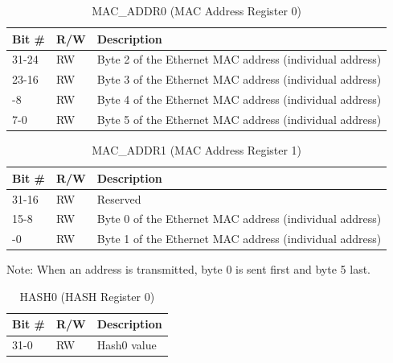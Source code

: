 \begin{xltabular}{\textwidth}{|l|l|X|}
  
  \hline
  {\bf Bit \#} & {\bf R/W} & {\bf Description} \\ \hline \hline
  \endfirsthead
  \hline
  \caption{MAC\_ADDR0 (MAC Address Register 0)}
  \endlastfoot

  31-24   & RW  & Byte 2 of the Ethernet MAC address (individual address) \\* \nobreakhline
  23-16   & RW  & Byte 3 of the Ethernet MAC address (individual address) \\* -8    & RW  & Byte 4 of the Ethernet MAC address (individual address) \\* \nobreakhline
  7-0     & RW  & Byte 5 of the Ethernet MAC address (individual address) \\
                  \hline
\end{xltabular}
\label{csr_details:mac_addr0}

\begin{xltabular}{\textwidth}{|l|l|X|}
  
  \hline
  {\bf Bit \#} & {\bf R/W} & {\bf Description} \\ \hline \hline
  \endfirsthead
  \hline
  \caption{MAC\_ADDR1 (MAC Address Register 1)}
  \endlastfoot

  31-16   & RW  & Reserved \\* \nobreakhline
  15-8    & RW  & Byte 0 of the Ethernet MAC address (individual address) \\* -0     & RW  & Byte 1 of the Ethernet MAC address (individual address) \\
\end{xltabular}
\label{csr_details:mac_addr1}

Note: When an address is transmitted, byte 0 is sent first and byte 5 last.

\begin{xltabular}{\textwidth}{|l|l|X|}
  
  \hline
  {\bf Bit \#} & {\bf R/W} & {\bf Description} \\ \hline \hline
  \endfirsthead
  \hline
  \caption{HASH0 (HASH Register 0)}
  \endlastfoot

  31-0   & RW  & Hash0 value \\ \hline
\end{xltabular}
\label{csr_details:hash0}

